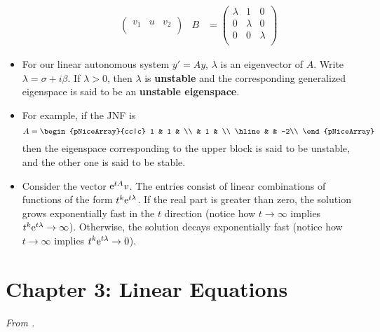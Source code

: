 \documentclass[../notes.tex]{subfiles}
\begin{document}
\begin{itemize}
\begin{itemize}
\begin{align*}
\begin{pmatrix}
                v_1 & u & v_2\\
            \end{pmatrix}&
            B &=
            \begin{pmatrix}
                \lambda & 1 & 0\\
                0 & \lambda & 0\\
                0 & 0 & \lambda\\
            \end{pmatrix}
        \end{align*}
    \end{itemize}
    \item For our linear autonomous system $y'=Ay$, $\lambda$ is an eigenvector of $A$. Write $\lambda=\sigma+i\beta$. If $\lambda>0$, then $\lambda$ is \textbf{unstable} and the corresponding generalized eigenspace is said to be an \textbf{unstable eigenspace}.
    \item For example, if the JNF is
    \begin{equation*}
        A =
        \begin{pNiceArray}{cc|c}
            1 & 1 & \\
             & 1 & \\
            \hline
             &  & -2\\
        \end{pNiceArray}
    \end{equation*}
    then the eigenspace corresponding to the upper block is said to be unstable, and the other one is said to be stable.
    \item Consider the vector $\e[tA]v$. The entries consist of linear combinations of functions of the form $t^k\e[t\lambda]$. If the real part is greater than zero, the solution grows exponentially fast in the $t$ direction (notice how $t\to\infty$ implies $t^k\e[t\lambda]\to\infty$). Otherwise, the solution decays exponentially fast (notice how $t\to\infty$ implies $t^k\e[t\lambda]\to 0$).
\end{itemize}



\section{Chapter 3: Linear Equations}
\emph{From \textcite{bib:Teschl}.}
\end{document}
